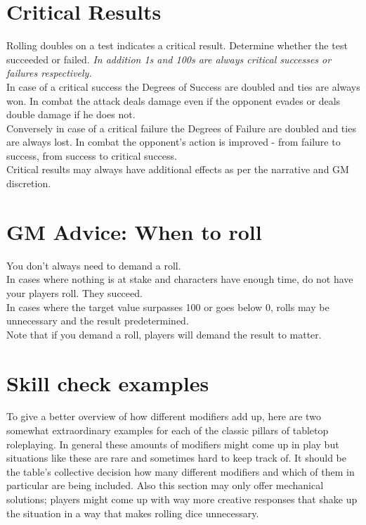 \documentclass[12pt,a4paper,openany,usenames,dvipsnames]{book}
\begin{document}
	\section{Critical Results}
	Rolling doubles on a test indicates a critical result. Determine whether the test succeeded or failed.
	\textit{In addition 1s and 100s are always critical successes or failures respectively.}\\
	In case of a critical success the Degrees of Success are doubled and ties are always won.
	In combat the attack deals damage even if the opponent evades or deals double damage if he does not.\\
	Conversely in case of a critical failure the Degrees of Failure are doubled and ties are always lost.
	In combat the opponent's action is improved - from failure to success, from success to critical success.\\
	Critical results may always have additional effects as per the narrative and GM discretion.
	
	\section{GM Advice: When to roll}
	You don't always need to demand a roll.\\
	In cases where nothing is at stake and characters have enough time, do not have your players roll. They succeed.\\
	In cases where the target value surpasses 100 or goes below 0, rolls may be unnecessary and the result predetermined.\\
	Note that if you demand a roll, players will demand the result to matter.
	
	\section{Skill check examples}
	To give a better overview of how different modifiers add up, here are two somewhat extraordinary examples for each of the classic pillars of tabletop roleplaying. In general these amounts of modifiers might come up in play but situations like these are rare and sometimes hard to keep track of.
	It should be the table’s collective decision how many different modifiers and which of them in particular are being included. Also this section may only offer mechanical solutions; players might come up with way more creative responses that shake up the situation in a way that makes rolling dice unnecessary.
	
	\pagebreak
	
\end{document}
